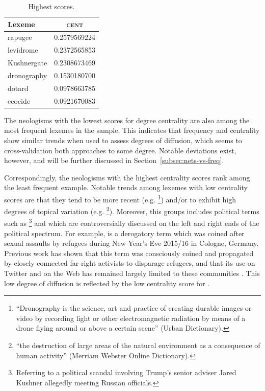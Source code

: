 \documentclass[
  a4paper,
  abstract=on,
  captions=tableabove
  ]{scrartcl}
\begin{document}
\begin{table}
\begin{subtable}{.3\linewidth}
          \centering
          \caption{Highest scores.}
          \begin{tabular}{l S[table-format=1.4, round-mode=places, round-precision=4]}
            \toprule
            Lexeme      & {\textsc{cent}} \\
            \midrule
            rapugee     & 0.2579569224 \\
            levidrome   & 0.2372565853 \\
            Kushnergate	& 0.2308673469 \\
            dronography	& 0.1530180700 \\
            dotard      & 0.0978663785 \\
            ecocide     & 0.0921670083 \\
            \bottomrule
          \end{tabular}
        \end{subtable}
      \end{table}

      The neologisms with the lowest scores for degree centrality are also among the most frequent lexemes in the sample. This indicates that frequency and centrality show similar trends when used to assess degrees of diffusion, which seems to cross-validation both approaches to some degree. Notable deviations exist, however, and will be further discussed in Section~\ref{subsec:nets-vs-freq}.

      Correspondingly, the neologisms with the highest centrality scores rank among the least frequent example. Notable trends among lexemes with low centrality scores are that they tend to be more recent (e.g. \footnote{\enquote{Dronography is the science, art and practice of creating durable images or video by recording light or other electromagnetic radiation by means of a drone flying around or above a certain scene} (Urban Dictionary).}) and/or to exhibit high degrees of topical variation (e.g. \footnote{\enquote{the destruction of large areas of the natural environment as a consequence of human activity} (Merriam Webster Online Dictionary).}). Moreover, this groups includes political terms such as \footnote{Referring to a political scandal involving Trump's senior adviser Jared Kushner allegedly meeting Russian officials.} and  which are controversially discussed on the left and right ends of the political spectrum. For example,  is a derogatory term which was coined after sexual assaults by refugees during New Year's Eve 2015/16 in Cologne, Germany. Previous work has shown that this term was consciously coined and propagated by closely connected far-right activists to disparage refugees, and that its use on Twitter and on the Web has remained largely limited to these communities \parencite{Wurschinger2016UsingWeb}. This low degree of diffusion is reflected by the low centrality score for .
\end{document}
